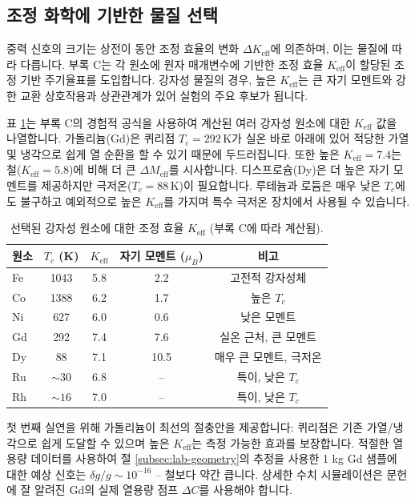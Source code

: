 \documentclass[11pt,a4paper]{article}
\newcommand{\Keff}{K_{\mathrm{eff}}}
\begin{document}
	\subsection{조정 화학에 기반한 물질 선택}
	\label{subsec:material-choice}
	
	중력 신호의 크기는 상전이 동안 조정 효율의 변화 $\Delta \Keff$에 의존하며, 이는 물질에 따라 다릅니다. 부록 C는 각 원소에 원자 매개변수에 기반한 조정 효율 $\Keff$이 할당된 조정 기반 주기율표를 도입합니다. 강자성 물질의 경우, 높은 $\Keff$는 큰 자기 모멘트와 강한 교환 상호작용과 상관관계가 있어 실험의 주요 후보가 됩니다.
	
	표 \ref{tab:ferro-keff-appP}는 부록 C의 경험적 공식을 사용하여 계산된 여러 강자성 원소에 대한 $\Keff$ 값을 나열합니다. 가돌리늄(Gd)은 퀴리점 $T_c = 292\,\mathrm{K}$가 실온 바로 아래에 있어 적당한 가열 및 냉각으로 쉽게 열 순환을 할 수 있기 때문에 두드러집니다. 또한 높은 $\Keff = 7.4$는 철($\Keff = 5.8$)에 비해 더 큰 $\Delta M_{\mathrm{eff}}$를 시사합니다. 디스프로슘(Dy)은 더 높은 자기 모멘트를 제공하지만 극저온($T_c = 88\,\mathrm{K}$)이 필요합니다. 루테늄과 로듐은 매우 낮은 $T_c$에도 불구하고 예외적으로 높은 $\Keff$를 가지며 특수 극저온 장치에서 사용될 수 있습니다.
	
	\begin{table}[htbp]
		\centering
		\caption{선택된 강자성 원소에 대한 조정 효율 \(\Keff\) (부록 C에 따라 계산됨).}
		\label{tab:ferro-keff-appP}
		\begin{tabular}{lcccc}
			\toprule
			원소 & \(T_c\) (K) & \(\Keff\) & 자기 모멘트 (\(\mu_B\)) & 비고 \\
			\midrule
			Fe & 1043 & 5.8 & 2.2 & 고전적 강자성체 \\
			Co & 1388 & 6.2 & 1.7 & 높은 \(T_c\) \\
			Ni & 627  & 6.0 & 0.6 & 낮은 모멘트 \\
			Gd & 292  & 7.4 & 7.6 & 실온 근처, 큰 모멘트 \\
			Dy & 88   & 7.1 & 10.5 & 매우 큰 모멘트, 극저온 \\
			Ru & \(\sim 30\) & 6.8 & -- & 특이, 낮은 \(T_c\) \\
			Rh & \(\sim 16\) & 7.0 & -- & 특이, 낮은 \(T_c\) \\
			\bottomrule
		\end{tabular}
	\end{table}
	
	첫 번째 실연을 위해 가돌리늄이 최선의 절충안을 제공합니다: 퀴리점은 기존 가열/냉각으로 쉽게 도달할 수 있으며 높은 $\Keff$는 측정 가능한 효과를 보장합니다. 적절한 열용량 데이터를 사용하여 절 \ref{subsec:lab-geometry}의 추정을 사용한 1 kg Gd 샘플에 대한 예상 신호는 $\delta g/g \sim 10^{-16}$ – 철보다 약간 큽니다. 상세한 수치 시뮬레이션은 문헌에 잘 알려진 Gd의 실제 열용량 점프 $\Delta C$를 사용해야 합니다.
	
\end{document}
